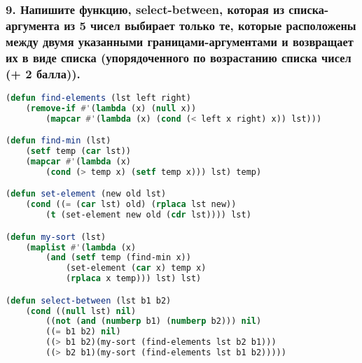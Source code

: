 \subsubsection*{9. Напишите функцию, select-between, которая из списка-аргумента из 5 чисел выбирает	только те, которые расположены между двумя указанными границами-аргументами и	возвращает их в виде списка (упорядоченного по возрастанию списка чисел (+ 2 балла)).}
\begin{lstlisting}[language=Lisp]
(defun find-elements (lst left right)
	(remove-if #'(lambda (x) (null x))
		(mapcar #'(lambda (x) (cond (< left x right) x)) lst)))

(defun find-min (lst)
	(setf temp (car lst))
	(mapcar #'(lambda (x)
		(cond (> temp x) (setf temp x))) lst) temp)

(defun set-element (new old lst)
	(cond ((= (car lst) old) (rplaca lst new))
		(t (set-element new old (cdr lst)))) lst)

(defun my-sort (lst)
	(maplist #'(lambda (x)
		(and (setf temp (find-min x))
			(set-element (car x) temp x)
			(rplaca x temp))) lst) lst)

(defun select-between (lst b1 b2)
	(cond ((null lst) nil)
		((not (and (numberp b1) (numberp b2))) nil)
		((= b1 b2) nil)
		((> b1 b2)(my-sort (find-elements lst b2 b1)))
		((> b2 b1)(my-sort (find-elements lst b1 b2)))))
\end{lstlisting}
